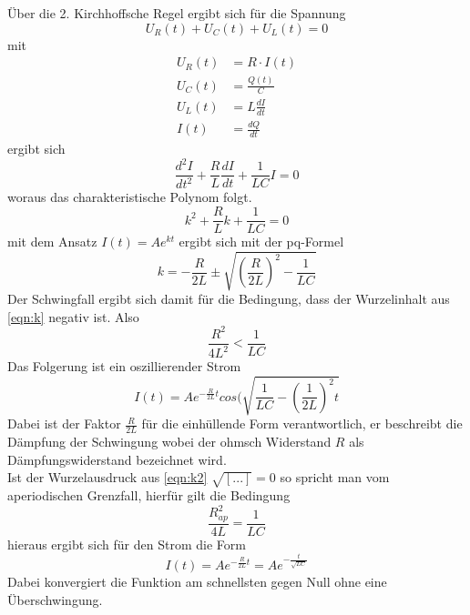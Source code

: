 Über die 2. Kirchhoffsche Regel ergibt sich für die Spannung
\begin{equation}
    U_R(t)+U_C(t)+U_L(t)=0
\end{equation}
mit
\begin{align*}
    U_R(t)&=R \cdot I(t)\\
    U_C(t)&=\frac{Q(t)}{C}\\
    U_L(t)&=L\frac{dI}{dt}\\
    I(t)&=\frac{dQ}{dt}
\end{align*}
ergibt sich
\begin{equation}
    \frac{d^2I}{dt^2}+\frac{R}{L}\frac{dI}{dt}+\frac{1}{LC}I=0
\end{equation}
woraus das charakteristische Polynom folgt.
\begin{equation}
    k^2+\frac{R}{L}k+\frac{1}{LC}=0
\end{equation}
mit dem Ansatz $I(t)=Ae^{kt}$ ergibt sich mit der pq-Formel
\begin{equation}
    k=-\frac{R}{2L} \pm \sqrt{(\frac{R}{2L})^2-\frac{1}{LC}}                          %
    \label{eqn:k1}
\end{equation}
Der Schwingfall ergibt sich damit für die Bedingung, dass der Wurzelinhalt 
aus \eqref{eqn:k} negativ ist. Also
\begin{equation}
    \frac{R^2}{4L^2}<\frac{1}{LC}
    \label{eqn:k2}
\end{equation}
Das Folgerung ist ein oszillierender Strom
\begin{equation}
    I(t)=Ae^{-\frac{R}{2L}t}cos(\sqrt{\frac{1}{LC}-(\frac{1}{2L})^2t}
\end{equation} 
Dabei ist der Faktor $\frac{R}{2L}$ für die einhüllende Form verantwortlich,
er beschreibt die Dämpfung der Schwingung wobei der ohmsch Widerstand $R$ als 
Dämpfungswiderstand bezeichnet wird.\\

Ist der Wurzelausdruck aus \eqref{eqn:k2} $\sqrt{[...]}=0$
so spricht man vom aperiodischen Grenzfall, hierfür gilt die Bedingung
\begin{equation}
    \frac{R_{ap}^2}{4L}=\frac{1}{LC}
\end{equation}
hieraus ergibt sich für den Strom die Form
\begin{equation}
    I(t)=Ae^{-\frac{R}{2L}t}=Ae^{-\frac{t}{\sqrt{LC}}}
\end{equation}
Dabei konvergiert die Funktion am schnellsten gegen Null ohne eine Überschwingung.\\\\

